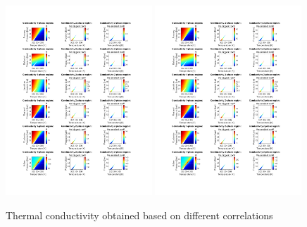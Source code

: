 \documentclass[../Article_Model_Parameters.tex]{subfiles}
\begin{document}
	\begin{figure}[H]
		\centering
		\includegraphics[trim = 1.5cm 14.25cm 14cm 2.0cm,clip,width=0.49\textwidth]{Figures/KT.pdf}	
		\includegraphics[trim = 1.5cm 2.8cm 14cm 13.75cm,clip,width=0.49\textwidth]{Figures/KT.pdf}	
		\caption{Thermal conductivity obtained based on different correlations }
		\label{fig: SFE_Properties_kt}
	\end{figure} 
	
\end{document}
